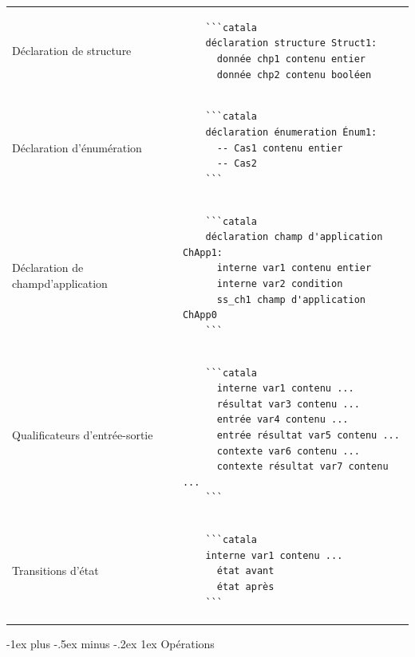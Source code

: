 \documentclass{article}
\makeatletter
\newcommand\articlenormalsize{\fontsize{10pt}{12pt}\selectfont}
\renewcommand{\section}{\@startsection{section}{1}{0mm}%
                                {-1ex plus -.5ex minus -.2ex}%
                                {1ex}%
                                {\normalfont\articlenormalsize\bfseries}}
\newenvironment{catala}{%
  \VerbatimEnvironment
  \let\FV@ListVSpace\relax
  \begin{verbatim}}%
 {\end{verbatim}}
\makeatother
\begin{document}
\begin{multicols}{3}
\begin{tabular}{@{}p{\cola}p{\colb}@{}}
  Déclaration de structure &
  \begin{catala}
    ```catala
    déclaration structure Struct1:
      donnée chp1 contenu entier
      donnée chp2 contenu booléen
  \end{catala}
  \\
  Déclaration d'énumération & \begin{catala}
    ```catala
    déclaration énumeration Énum1:
      -- Cas1 contenu entier
      -- Cas2
    ```
  \end{catala}
  \\
  Déclaration de champ\newline d'application & \begin{catala}
    ```catala
    déclaration champ d'application ChApp1:
      interne var1 contenu entier
      interne var2 condition
      ss_ch1 champ d'application ChApp0
    ```
  \end{catala}
  \\
  Qualificateurs d'entrée-\newline sortie & \begin{catala}
    ```catala
      interne var1 contenu ...
      résultat var3 contenu ...
      entrée var4 contenu ...
      entrée résultat var5 contenu ...
      contexte var6 contenu ...
      contexte résultat var7 contenu ...
    ```
  \end{catala}
  \\
  Transitions d'état & \begin{catala}
    ```catala
    interne var1 contenu ...
      état avant
      état après
    ```
  \end{catala}
  \\
\end{tabular}

\section{Opérations}


\end{multicols}
\end{document}
